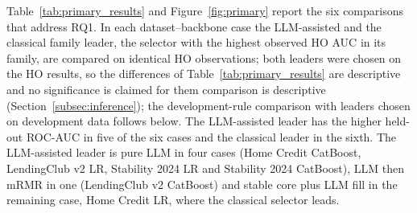 \documentclass[final,5p,twocolumn]{elsarticle}
\providecommand{\DIFaddtex}[1]{{\protect\color{blue} \sf #1}} %
\providecommand{\DIFdeltex}[1]{{\protect\color{red} \scriptsize #1}} %
\providecommand{\DIFaddbegin}{} %
\providecommand{\DIFaddend}{} %
\providecommand{\DIFdelbegin}{} %
\providecommand{\DIFdelend}{} %
\providecommand{\DIFadd}[1]{\texorpdfstring{\DIFaddtex{#1}}{#1}} %
\providecommand{\DIFdel}[1]{\texorpdfstring{\DIFdeltex{#1}}{}} %
\begin{document}
Table~\ref{tab:primary_results} and Figure~\ref{fig:primary} report the six comparisons that address RQ1. In each dataset--backbone case the LLM-assisted and the classical family leader, the selector with the highest observed HO AUC in its family, are compared on identical HO observations; both leaders were chosen on the HO results, so the \DIFdelbegin \DIFdel{differences of Table~\ref{tab:primary_results} are descriptive and no significance is claimed for them }\DIFdelend \DIFaddbegin \DIFadd{comparison is descriptive }\DIFaddend (Section~\ref{subsec:inference}); the development-rule comparison \DIFdelbegin \DIFdel{with leaders chosen on development data }\DIFdelend follows below. The LLM-assisted leader has the higher held-out ROC-AUC in five of the six cases and the classical leader in the sixth. The LLM-assisted leader is pure LLM in four cases (Home Credit CatBoost, LendingClub v2 LR, Stability 2024 LR and Stability 2024 CatBoost), LLM then mRMR in one (LendingClub v2 CatBoost) and stable core plus LLM fill in the remaining case, Home Credit LR, where the classical selector leads.
\end{document}
